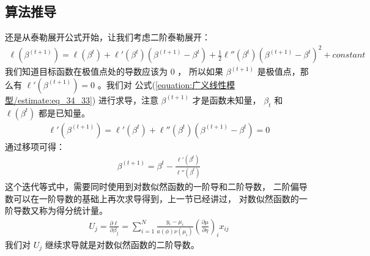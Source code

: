 \documentclass[letterpaper,10pt,english]{sphinxmanual}
\begin{document}
\subsection{算法推导}
\label{\detokenize{_u5e7f_u4e49_u7ebf_u6027_u6a21_u578b/estimate:id7}}
还是从泰勒展开公式开始，让我们考虑二阶泰勒展开：
\begin{equation}\label{equation:广义线性模型/estimate:eq_34_33}
\begin{split}\ell(\beta^{(t+1)}) = \ell(\beta^t) + \ell'(\beta^t)(\beta^{(t+1)} - \beta^t) +
\frac{1}{2}\ell''(\beta^t)(\beta^{(t+1)} - \beta^t)^2 + constant\end{split}
\end{equation}
我们知道目标函数在极值点处的导数应该为 \(0\) ，
所以如果 \(\beta^{(t+1)}\) 是极值点，那么有 \(\ell'(\beta^{(t+1)})=0\)
。我们对 公式(\ref{equation:广义线性模型/estimate:eq_34_33}) 进行求导，注意 \(\beta^{(t+1)}\) 才是函数未知量，
\(\beta_t\) 和 \(\ell(\beta^t)\) 都是已知量。
\begin{equation}\label{equation:广义线性模型/estimate:广义线性模型/estimate:25}
\begin{split}\ell'(\beta^{(t+1)})= \ell'(\beta^t) + \ell''(\beta^t)(\beta^{(t+1)}-\beta^t)=0\end{split}
\end{equation}
通过移项可得：
\begin{equation}\label{equation:广义线性模型/estimate:eq_34_34}
\begin{split}\beta^{(t+1)} = \beta^t - \frac{\ell'(\beta^t)}{\ell''(\beta^t)}\end{split}
\end{equation}
这个迭代等式中，需要同时使用到对数似然函数的一阶导和二阶导数，
二阶偏导数可以在一阶导数的基础上再次求导得到，上一节已经讲过，
对数似然函数的一阶导数又称为得分统计量。
\begin{equation}\label{equation:广义线性模型/estimate:广义线性模型/estimate:26}
\begin{split} U_j = \frac{\partial \ell}{\partial \beta_j}
= \sum_{i=1}^N \frac{y_i-\mu_i}{a(\phi) \nu(\mu_i) } \left ( \frac{\partial \mu}{\partial \eta} \right )_i x_{ij}\end{split}
\end{equation}
我们对 \(U_j\) 继续求导就是对数似然函数的二阶导数。
\end{document}
